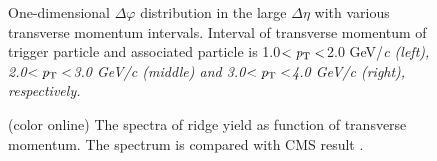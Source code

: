 \documentclass[ALICE,manyauthors]{cernphprep}
\begin{document}
\begin{figure}
	\centering
	\caption{ One-dimensional $\Delta\varphi$ distribution in the large $\Delta\eta$ with various transverse momentum intervals. Interval of transverse momentum of trigger particle and associated particle is 1.0$<\it{p}_{\rm{T}}<$2.0 GeV/\it{c}\rm{} (left), 2.0$<\it{p}_{\rm{T}}<$3.0 GeV/\it{c}\rm{} (middle) and 3.0$<\it{p}_{\rm{T}}<$4.0 GeV/\it{c}\rm{} (right), respectively. }

\end{figure}
 
\begin{figure}
	\centering
	\caption{(color online) The spectra of ridge yield as function of transverse momentum. The spectrum is compared with CMS result \cite{ridge_pp_1}.}
\end{figure}
\end{document}
